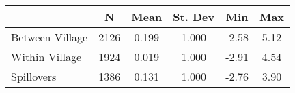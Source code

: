 \begin{tabular}{l*{5}{c}}\hline&\multicolumn{1}{c}{N}&\multicolumn{1}{c}{Mean}&\multicolumn{1}{c}{St. Dev}&\multicolumn{1}{c}{Min}&\multicolumn{1}{c}{Max}\\ \hline 
Between Village & 2126 & 0.199 & 1.000 & -2.58 & 5.12 \\
Within Village & 1924 & 0.019 & 1.000 & -2.91 & 4.54 \\
Spillovers & 1386 & 0.131 & 1.000 & -2.76 & 3.90 \\
\hline \end{tabular}
